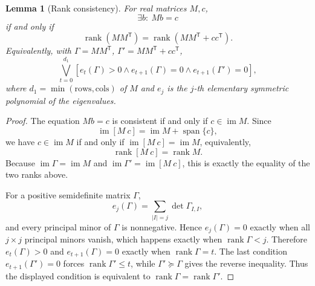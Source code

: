 \documentclass[journal]{IEEEtran}
\theoremstyle{plainn}
\newtheorem{lem}{Lemma}
\theoremstyle{remark}
\begin{document}
\begin{lem}[Rank consistency]\label{lem:rankcons}
	For real matrices $M,c$,
	\begin{equation}
		\exists b:\ Mb=c
	\end{equation}
	if and only if
	\begin{equation}
		\operatorname{rank}(MM^{\mathsf T})
		=\operatorname{rank}(MM^{\mathsf T}+cc^{\mathsf T}).
	\end{equation}
	Equivalently, with $\Gamma=MM^{\mathsf T}$, $\Gamma'=MM^{\mathsf T}+cc^{\mathsf T}$,
	\begin{equation}
		\bigvee_{t=0}^{d_1}
		\left[e_t(\Gamma)>0\wedge e_{t+1}(\Gamma)=0\wedge e_{t+1}(\Gamma')=0\right],
	\end{equation}
	where $d_1=\min(\text{rows},\text{cols})$ of $M$ and $e_j$ is the $j$-th elementary symmetric polynomial of the eigenvalues.
\end{lem}

\begin{proof}
	The equation $Mb=c$ is consistent if and only if
	$c\in\operatorname{im}M$. Since
	\begin{equation*}
	\operatorname{im}[M\ c]=\operatorname{im}M+\operatorname{span}\{c\},
	\end{equation*}
	we have $c\in\operatorname{im}M$ if and only if
	$\operatorname{im}[M\ c]=\operatorname{im}M$, equivalently,
	\begin{equation*}
	\operatorname{rank}[M\ c]=\operatorname{rank}M.
	\end{equation*}
	Because $\operatorname{im}\Gamma=\operatorname{im}M$ and
	$\operatorname{im}\Gamma'=\operatorname{im}[M\ c]$, this is exactly
	the equality of the two ranks above.
	
	For a positive semidefinite matrix $\Gamma$,
	\begin{equation}
	e_j(\Gamma)=\sum_{|I|=j}\det\Gamma_{I,I},
	\end{equation}
	and every principal minor of $\Gamma$ is nonnegative. Hence
	$e_j(\Gamma)=0$ exactly when all $j\times j$ principal minors
	vanish, which happens exactly when $\operatorname{rank}\Gamma<j$.
	Therefore $e_t(\Gamma)>0$ and $e_{t+1}(\Gamma)=0$ exactly when
	$\operatorname{rank}\Gamma=t$. The last condition
	$e_{t+1}(\Gamma')=0$ forces $\operatorname{rank}\Gamma'\le t$,
	while $\Gamma'\succeq\Gamma$ gives the reverse inequality. Thus the
	displayed condition is equivalent to
	$\operatorname{rank}\Gamma=\operatorname{rank}\Gamma'$.
\end{proof}
\end{document}
